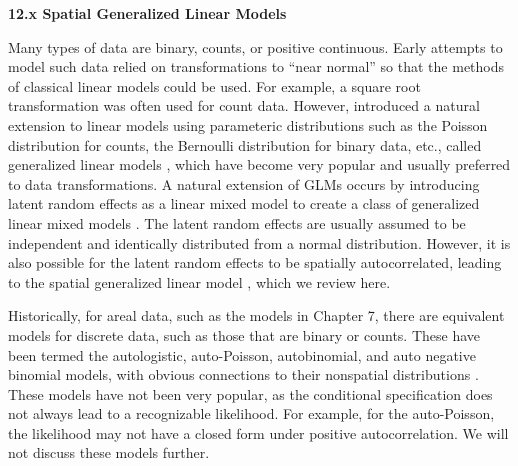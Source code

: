 \documentclass[12pt, titlepage]{article}
\begin{document}
\setcounter{equation}{0}
\renewcommand{\theequation}{12.\arabic{equation}}


%
%

{\Large \flushleft \textbf{12.x Spatial Generalized Linear Models}}

\vspace{.3cm}

Many types of data are binary, counts, or positive continuous.  Early attempts to model such data relied on transformations to ``near normal'' so that the methods of classical linear models could be used.  For example, a square root transformation was often used for count data.  However, \citet{NelderEtAl1972GeneralizedLinearModels370} introduced a natural extension to linear models using parameteric distributions such as the Poisson distribution for counts, the Bernoulli distribution for binary data, etc., called  generalized linear models \citep[GLM,][]{McCullaghEtAl1989GeneralizedLinearModels}, which have become very popular and usually preferred to data transformations.  A natural extension of GLMs occurs by introducing latent random effects as a linear mixed model to create a class of generalized linear mixed models \citep[GLMM,][]{breslow_approximate_1993}.  The latent random effects are usually assumed to be independent and identically distributed from a normal distribution.  However, it is also possible for the latent random effects to be spatially autocorrelated, leading to the spatial generalized linear model \citep[SGLM,][]{GotwayEtAl1997GeneralizedLinearModel157, DiggleEtAl1998ModelbasedGeostatisticsDisc299}, which we review here.

Historically, for areal data, such as the models in Chapter 7, there are equivalent models for discrete data, such as those that are binary or counts.  These have been termed the autologistic, auto-Poisson, autobinomial, and auto negative binomial models, with obvious connections to their nonspatial distributions \citep{Besag1974SpatialInteractionStatistical192, Cressie1993StatisticsSpatialData}.  These models have not been very popular, as the conditional specification does not always lead to a recognizable likelihood.  For example, for the auto-Poisson, the likelihood may not have a closed form under positive autocorrelation.  We will not discuss these models further.
\end{document}
